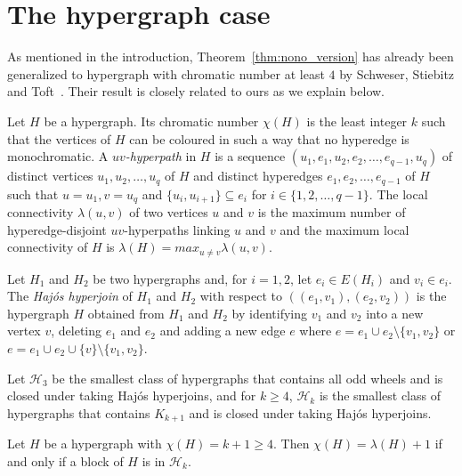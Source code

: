 

\section{The hypergraph case} \label{sec:hypergraph}

As mentioned in the introduction, Theorem~\ref{thm:nono_version} has already been generalized to hypergraph with chromatic number at least $4$ by  Schweser,  Stiebitz and  Toft~\cite{SST19}. Their result is closely related to ours as we explain below. %

Let $H$ be a hypergraph. 
Its chromatic number $\chi(H)$  is the least integer $k$ such that the vertices of $H$ can be coloured in such a way that no hyperedge is monochromatic. 
A \emph{$uv$-hyperpath} in $H$ is a sequence 
$(u_1, e_1, u_2, e_2, \dots , e_{q-1}, u_q)$ of distinct vertices 
$u_1, u_2, \dots , u_q$ of $H$ and distinct hyperedges $e_1, e_2,\dots , e_{q-1}$ of $H$ such that $u = u_1, v = u_q$ and $\{u_i, u_{i+1}\} \subseteq e_i$ for $i \in \{1, 2,\dots  , q - 1\}$. 
The local connectivity $\lambda(u,v)$ of two vertices $u$ and $v$  is the maximum number of hyperedge-disjoint $uv$-hyperpaths linking $u$ and $v$ and the maximum local connectivity of $H$ is $\lambda(H) = max_{u\neq v}\lambda(u,v)$. 

Let $H_1$ and $H_2$ be two hypergraphs and, for $i=1,2$, let $e_i \in E(H_i)$ and $v_i\in e_i$. The \emph{Haj\'os hyperjoin} of $H_1$ and $H_2$ with respect to $((e_1,v_1), (e_2, v_2))$ is the hypergraph $H$ obtained from $H_1$ and $H_2$ by identifying $v_1$ and $v_2$ into a new vertex $v$, deleting $e_1$ and $e_2$ and adding a new edge $e$ where $e=e_1\cup e_2 \setminus \{v_1,v_2\}$ or $e=e_1\cup e_2 \cup \{v\} \setminus \{v_1,v_2\}$. 

Let $\mathcal H_3$ be the smallest class of hypergraphs that contains all odd wheels and is closed under taking Haj\'os hyperjoins, and for $k \geq 4$, 
$\mathcal H_k$  is the smallest class of hypergraphs that contains $K_{k+1}$ and is closed under taking Haj\'os hyperjoins. 

\begin{theorem}\label{thm:main_hypergraph}
    Let  $H$ be a hypergraph with $\chi(H) = k+1 \geq 4$. Then $\chi(H) = \lambda(H) + 1$ if and only if a block of $H$ is in $\mathcal H_k$. 
\end{theorem}

